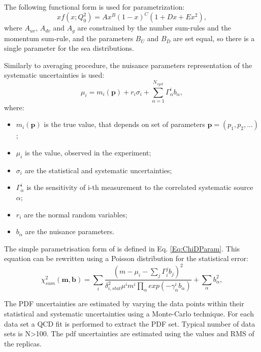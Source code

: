 The following functional form is used for parametrization:
\begin{equation}
xf(x; Q^2_0) = A x^{B} (1-x)^{C} (1+Dx+Ex^2),
\end{equation}
where $A_{uv}$, $A_{dv}$ and $A_g$ are constrained by the number sum-rules and the momentum sum-rule, and the parameters $B_{\bar{U}}$ and $B_{\bar{D}}$ are set equal, so there is a single parameter for the sea distributions.

Similarly to averaging procedure, the nuisance parameters representation of the systematic uncertainties is used:
\begin{equation}
\mu_i = m_i(\mathbf{p})+r_i\sigma_i + \sum_{\alpha=1}^{N_{syst}} \Gamma_{\alpha}^{i}b_{\alpha}, 
\end{equation}
where:
\begin{itemize}
\item $m_i(\mathbf{p})$ is the true value, that depends on set of parameters $\mathbf{p} = (p_1, p_2,...)$;
\item $\mu_i$ is the value, observed in the experiment;
\item $\sigma_i$ are the statistical and systematic uncertainties;
\item $\Gamma_{\alpha}^{i}$ is the sensitivity of i-th measurement to the correlated systematic source $\alpha$;
\item $r_i$ are the normal random variables;
\item $b_{\alpha}$ are the nuisance parameters.
\end{itemize}

The simple parametrisation form of \chiD is defined in Eq. \ref{Eq:ChiDParam}. This equation can be rewritten using a Poisson distribution for the statistical error:
\begin{equation}
\chi^{2}_{sum}(\mathbf{m},\mathbf{b})=\sum_{i} \frac{(m-\mu_i-\sum_j\Gamma_i^jb_j)^2}{\delta^{2}_{i,stat}\mu^{i}m^{i}\prod_{\alpha}exp(-\gamma_{\alpha}^ib_{\alpha})}+\sum_{\alpha} b_{\alpha}^2, 
\end{equation}

The PDF uncertainties are estimated by varying the data points within their statistical and systematic uncertainties using a Monte-Carlo technique. For each data set a QCD fit is performed to extract the PDF set.  Typical number of data sets is N>100. The pdf uncertainties are estimated using the values and RMS of the replicas.

